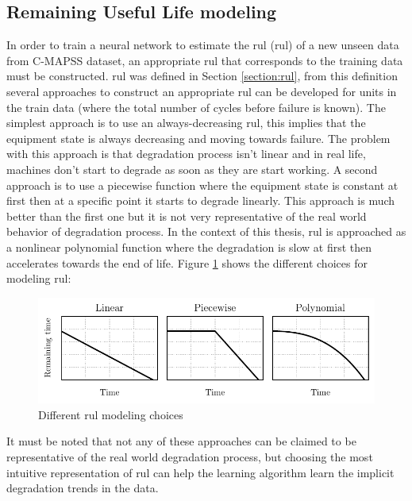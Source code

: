 \subsection{Remaining Useful Life modeling}
In order to train a neural network to estimate the \acrlong{rul} (\acrshort{rul}) of a new unseen data from C-MAPSS dataset, an appropriate \acrshort{rul} that corresponds to the training data must be constructed. \acrshort{rul} was defined in Section \ref{section:rul}, from this definition several approaches to construct an appropriate \acrshort{rul} can be developed for units in the train data (where the total number of cycles before failure is known). The simplest approach is to use an always-decreasing \acrshort{rul}, this implies that the equipment state is always decreasing and moving towards failure. The problem with this approach is that degradation process isn't linear and in real life, machines don't start to degrade as soon as they are start working. A second approach is to use a piecewise function where the equipment state is constant at first then at a specific point it starts to degrade linearly. This approach is much better than the first one but it is not very representative of the real world behavior of degradation process. In the context of this thesis, \acrshort{rul} is approached as a nonlinear polynomial function where the degradation is slow at first then accelerates towards the end of life. Figure \ref{fig:rul-models} shows the different choices for modeling \acrshort{rul}:

\begin{figure}[H]
    \centering
    \includegraphics{figures/rul_models.pdf}
    \caption{Different \acrshort{rul} modeling choices}
    \label{fig:rul-models}
\end{figure}

It must be noted that not any of these approaches can be claimed to be representative of the real world degradation process, but choosing the most intuitive representation of \acrshort{rul} can help the learning algorithm learn the implicit degradation trends in the data.

